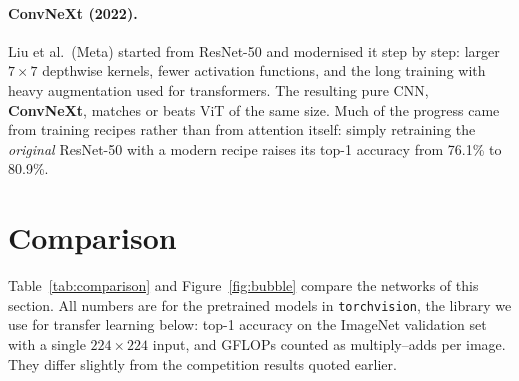 \documentclass[12pt, a4paper]{article}
\begin{document}
\paragraph{ConvNeXt (2022).}
Liu et al.\ (Meta) started from ResNet-50 and modernised it step by step:
larger $7\times7$ depthwise kernels, fewer activation functions, and the long
training with heavy augmentation used for transformers. The resulting pure
CNN, \textbf{ConvNeXt}, matches or beats ViT of the same size. Much of the
progress came from training recipes rather than from attention itself:
simply retraining the \emph{original} ResNet-50 with a modern recipe raises
its top-1 accuracy from 76.1\% to 80.9\%.

\section{Comparison}
\label{sec:comparison}

Table~\ref{tab:comparison} and Figure~\ref{fig:bubble} compare the networks of
this section. All numbers are for the pretrained models in
\texttt{torchvision}, the library we use for transfer learning below:
top-1 accuracy on the ImageNet validation set with a single
$224 \times 224$ input, and GFLOPs counted as multiply--adds per image. They
differ slightly from the competition results quoted earlier.
\end{document}
